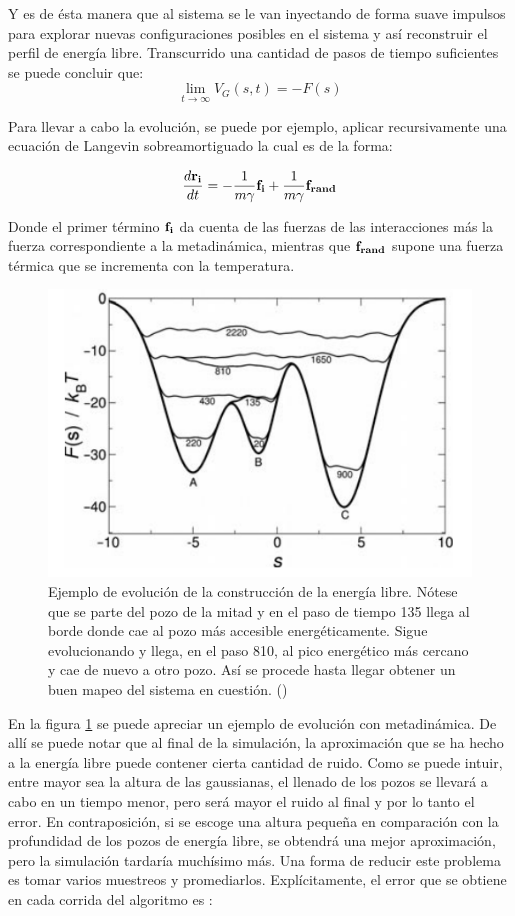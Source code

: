 \documentclass [11pt]{article}
\begin{document}
Y es de ésta manera que al sistema se le van inyectando de forma suave impulsos para explorar nuevas configuraciones posibles en el sistema y así reconstruir el perfil de energía libre.
Transcurrido una cantidad de pasos de tiempo suficientes se puede concluir que:
\begin{equation}
     \lim_{t\to\infty}V_G(s,t)=-F(s)
\end{equation}

Para llevar a cabo la evolución, se puede por ejemplo, aplicar recursivamente una ecuación de Langevin sobreamortiguado  \cite{zukerman} la cual es de la forma:

\begin{equation}
    \frac{d{\bf r_i}}{dt}=-\frac{1}{m\gamma}{\bf f_i}+\frac{1}{m\gamma}{\bf f_{rand}}
\end{equation}

Donde el primer término ${\bf f_i}$ da cuenta de las fuerzas de las interacciones más la fuerza correspondiente a la metadinámica, mientras que ${\bf f_{rand}}$ supone una fuerza térmica que se incrementa con la temperatura.\\

\begin{figure}[t]
\centering
\includegraphics[width=0.7\linewidth]{evolution}
\caption{Ejemplo de evolución de la construcción de la energía libre. Nótese que se parte del pozo de la mitad y en el paso de tiempo 135 llega al borde donde cae al pozo más accesible energéticamente. Sigue evolucionando y llega, en el paso 810, al pico energético más cercano y cae de nuevo a otro pozo. Así se procede hasta llegar obtener un buen mapeo del sistema en cuestión. ({\color{red}\cite{barducci}})}
\label{ejemplo_muestreo}
\end{figure}

En la figura \ref{ejemplo_muestreo} se puede apreciar un ejemplo de evolución con metadinámica. De allí se puede notar que al final de la simulación, la aproximación que se ha hecho a la energía libre puede contener cierta cantidad de ruido. Como se puede intuir, entre mayor sea la altura de las gaussianas, el llenado de los pozos se llevará a cabo en un tiempo menor, pero será mayor el ruido al final y por lo tanto el error. En contraposición, si se escoge una altura pequeña en comparación con la profundidad de los pozos de energía libre, se obtendrá una mejor aproximación, pero la simulación tardaría muchísimo más. Una forma de reducir este problema es tomar varios muestreos y promediarlos. Explícitamente, el error que se obtiene en cada corrida del algoritmo es \cite{barducci}:
\end{document}
